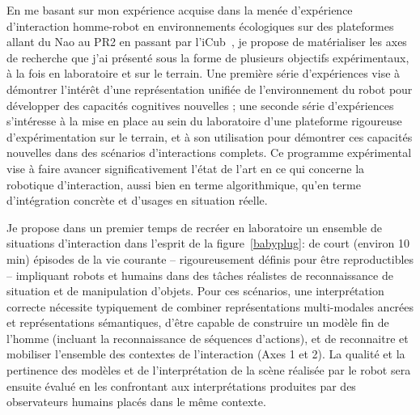 \documentclass[a4paper]{article}
\begin{document}
En me basant sur mon expérience acquise dans la menée d'expérience d'interaction
homme-robot en environnements écologiques sur des plateformes allant du Nao au
PR2 en passant par
l'iCub~\cite{lemaignan2010oro,ros2010which,lallee2011towards,lemaignan2012roboscopie,warnier2012when,hood2015when},
je propose de matérialiser les axes de recherche que j'ai présenté sous la forme
de plusieurs objectifs expérimentaux, à la fois en laboratoire et sur le
terrain.  Une première série d'expériences vise à démontrer l'intérêt d'une
représentation unifiée de l'environnement du robot pour développer des capacités
cognitives nouvelles ; une seconde série d'expériences s'intéresse à la mise en
place au sein du laboratoire d'une plateforme rigoureuse d'expérimentation sur
le terrain, et à son utilisation pour démontrer ces capacités nouvelles dans des
scénarios d'interactions complets. Ce programme expérimental vise à faire
avancer significativement l'état de l'art en ce qui concerne la robotique
d'interaction, aussi bien en terme algorithmique, qu'en terme d'intégration
concrète et d'usages en situation réelle.

Je propose dans un premier temps de recréer en laboratoire un ensemble de
situations d'interaction dans l'esprit de la figure~\ref{babyplug}: de court
(environ 10 min) épisodes de la vie courante -- rigoureusement définis pour être
reproductibles -- impliquant robots et humains dans des tâches réalistes de
reconnaissance de situation et de manipulation d'objets. Pour ces scénarios, une
interprétation correcte nécessite typiquement de combiner représentations
multi-modales ancrées et représentations sémantiques, d'être capable de
construire un modèle fin de l'homme (incluant la reconnaissance de séquences
d'actions), et de reconnaitre et mobiliser l'ensemble des contextes de
l'interaction (Axes 1 et 2). La qualité et la pertinence des modèles et de
l'interprétation de la scène réalisée par le robot sera ensuite évalué en les
confrontant aux interprétations produites par des observateurs humains placés
dans le même contexte.
\end{document}
